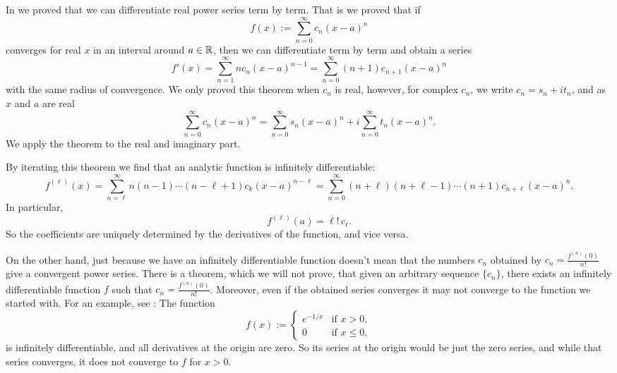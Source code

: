 In  we proved that we can
differentiate real power series term by term.  That is
we proved that if
\begin{equation*}
f(x) := \sum_{n=0}^\infty c_n {(x-a)}^n
\end{equation*}
converges for real $x$ in an interval around $a \in {\mathbb{R}}$, then we can differentiate
term by term and obtain a series
\begin{equation*}
f'(x) =
\sum_{n=1}^\infty n c_n {(x-a)}^{n-1}
=
\sum_{n=0}^\infty (n+1)c_{n+1} {(x-a)}^{n} 
\end{equation*}
with the same radius of convergence.
We only proved this theorem when $c_n$ is real, however, for complex $c_n$,
we write
$c_n = s_n + i t_n$, and as $x$ and $a$ are real
\begin{equation*}
\sum_{n=0}^\infty c_n {(x-a)}^n
=
\sum_{n=0}^\infty s_n {(x-a)}^n
+
i
\sum_{n=0}^\infty t_n {(x-a)}^n .
\end{equation*}
We apply the theorem to the real and
imaginary part.

By iterating this theorem we find that an
analytic function is infinitely differentiable:
\begin{equation*}
f^{(\ell)}(x) =
\sum_{n=\ell}^\infty n(n-1)\cdots(n-\ell+1)c_k {(x-a)}^{n-\ell}
=
\sum_{n=0}^\infty (n+\ell)(n+\ell-1)\cdots (n+1) c_{n+\ell} {(x-a)}^{n} .
\end{equation*}
In particular,
\begin{equation} \label{eq:formulaforpscoeffs}
f^{(\ell)}(a) = \ell! \, c_\ell .
\end{equation}
So the coefficients are uniquely determined by the derivatives of the
function, and vice versa.

On the other hand, just because we have an infinitely differentiable
function doesn't mean that the numbers $c_n$ obtained by
$c_n = \frac{f^{(n)}(0)}{n!}$ give a convergent power series.
There is a theorem, which we will not prove,
that given an arbitrary sequence $\{ c_n \}$, there exists an
infinitely differentiable function $f$ such that
$c_n = \frac{f^{(n)}(0)}{n!}$.  Moreover, even if the obtained series
converges it may not converge to the function we started with.
For an example,
see :  The
function
\begin{equation*}
f(x) :=
\begin{cases}
e^{-1/x} & \text{if } x > 0,\\
0        & \text{if } x \leq 0,
\end{cases}
\end{equation*}
is infinitely differentiable, and all derivatives at the origin are zero.
So
its series at the origin would be just the zero series, and while that
series converges, it does not converge to $f$ for $x > 0$.

